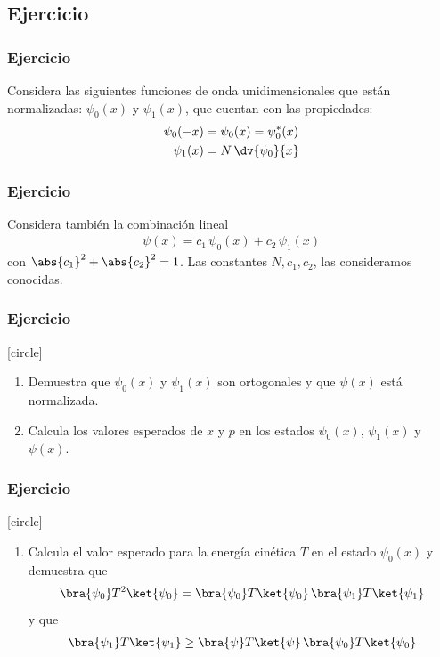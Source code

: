 \subsection{Ejercicio}
\begin{frame}
\frametitle{Ejercicio}
Considera las siguientes funciones de onda unidimensionales que están normalizadas: $\psi_{0}(x)$ y $\psi_{1}(x)$, que cuentan con las propiedades:
\begin{align*}
\psi_{0}(-x) &= \psi_{0}(x) = \psi_{0}^{*} (x) \\
\psi_{1}(x) &= N \, \dv{\psi_{0}}{x}
\end{align*}
\end{frame}
\begin{frame}
\frametitle{Ejercicio}
Considera también la combinación lineal
\begin{align*}
\psi(x) = c_{1} \, \psi_{0}(x) + c_{2} \, \psi_{1} (x)
\end{align*}
con $\abs{c_{1}}^{2} + \abs{c_{2}}^{2} = 1$. Las constantes $N, c_{1}, c_{2}$, las consideramos conocidas.
\end{frame}
\begin{frame}
\frametitle{Ejercicio}
[circle]
\begin{enumerate}[<+->]
\item Demuestra que $\psi_{0}(x)$ y $\psi_{1}(x)$ son ortogonales y que $\psi(x)$ está normalizada.
\item Calcula los valores esperados de $x$ y $p$ en los estados $\psi_{0}(x)$, $\psi_{1}(x)$ y $\psi(x)$.
\seti
\end{enumerate}
\end{frame}
\begin{frame}
\frametitle{Ejercicio}
[circle]
\begin{enumerate}[<+->]
\conti
\item Calcula el valor esperado para la energía cinética $T$ en el estado $\psi_{0}(x)$ y demuestra que
\begin{align*}
\bra{\psi_{0}} T^{2} \ket{\psi_{0}} = \bra{\psi_{0}} T \ket{\psi_{0}} \, \bra{\psi_{1}} T \ket{\psi_{1}}
\end{align*}
y que 
\begin{align*}
\bra{\psi_{1}} T \ket{\psi_{1}} \geq \bra{\psi} T \ket{\psi} \, \bra{\psi_{0}} T \ket{\psi_{0}}
\end{align*}
\end{enumerate}
\end{frame}
